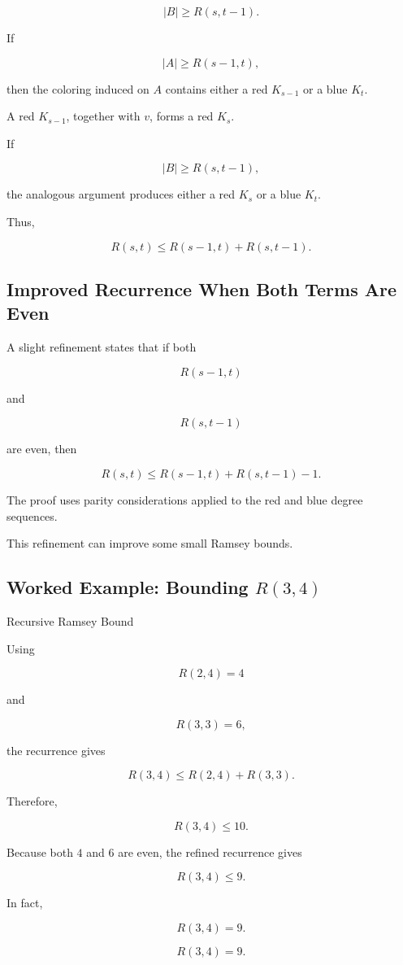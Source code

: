 \[
|B|\geq R(s,t-1).
\]

If

\[
|A|\geq R(s-1,t),
\]

then the coloring induced on \(A\) contains either a red \(K_{s-1}\) or
a blue \(K_t\).

A red \(K_{s-1}\), together with \(v\), forms a red \(K_s\).

If

\[
|B|\geq R(s,t-1),
\]

the analogous argument produces either a red \(K_s\) or a blue \(K_t\).

Thus,

\[
\boxed{
R(s,t)
\leq
R(s-1,t)+R(s,t-1).
}
\]

\subsection{Improved Recurrence When Both Terms Are Even}
\label{subsec:ramsey-improved-recurrence}

A slight refinement states that if both

\[
R(s-1,t)
\]

and

\[
R(s,t-1)
\]

are even, then

\[
\boxed{
R(s,t)
\leq
R(s-1,t)+R(s,t-1)-1.
}
\]

The proof uses parity considerations applied to the red and blue degree
sequences.

This refinement can improve some small Ramsey bounds.

\subsection{Worked Example: Bounding \(R(3,4)\)}
\label{subsec:worked-r34}

\begin{workedexamplebox}{Recursive Ramsey Bound}

Using

\[
R(2,4)=4
\]

and

\[
R(3,3)=6,
\]

the recurrence gives

\[
R(3,4)
\leq
R(2,4)+R(3,3).
\]

Therefore,

\[
R(3,4)\leq10.
\]

Because both \(4\) and \(6\) are even, the refined recurrence gives

\[
R(3,4)\leq9.
\]

In fact,

\[
R(3,4)=9.
\]

\begin{answerbox}
\[
\boxed{
R(3,4)=9.
}
\]
\end{answerbox}

\end{workedexamplebox}


